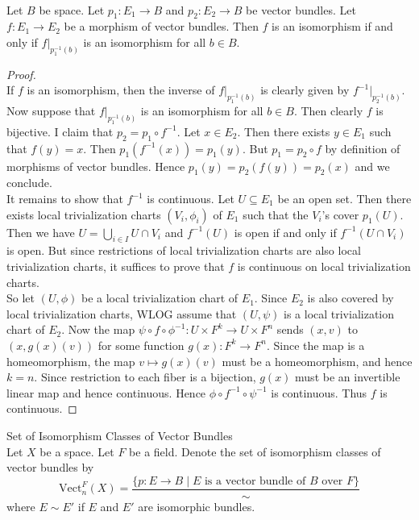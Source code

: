 \documentclass[a4paper]{article}
\begin{document}
\begin{lmm}{}{}\\
Let $B$ be space. Let $p_1:E_1\to B$ and $p_2:E_2\to B$ be vector bundles. Let $f:E_1\to E_2$ be a morphism of vector bundles. Then $f$ is an isomorphism if and only if $f|_{p_1^{-1}(b)}$ is an isomorphism for all $b\in B$. 
\begin{proof}\\
If $f$ is an isomorphism, then the inverse of $f|_{p_1^{-1}(b)}$ is clearly given by $f^{-1}|_{p_2^{-1}(b)}$. \\

Now suppose that $f|_{p_1^{-1}(b)}$ is an isomorphism for all $b\in B$. Then clearly $f$ is bijective. I claim that $p_2=p_1\circ f^{-1}$. Let $x\in E_2$. Then there exists $y\in E_1$ such that $f(y)=x$. Then $p_1(f^{-1}(x))=p_1(y)$. But $p_1=p_2\circ f$ by definition of morphisms of vector bundles. Hence $p_1(y)=p_2(f(y))=p_2(x)$ and we conclude. \\

It remains to show that $f^{-1}$ is continuous. Let $U\subseteq E_1$ be an open set. Then there exists local trivialization charts $(V_i,\phi_i)$ of $E_1$ such that the $V_i$'s cover $p_1(U)$. Then we have $U=\bigcup_{i\in I}U\cap V_i$ and $f^{-1}(U)$ is open if and only if $f^{-1}(U\cap V_i)$ is open. But since restrictions of local trivialization charts are also local trivialization charts, it suffices to prove that $f$ is continuous on local trivialization charts. \\

So let $(U,\phi)$ be a local trivialization chart of $E_1$. Since $E_2$ is also covered by local trivialization charts, WLOG assume that $(U,\psi)$ is a local trivialization chart of $E_2$. Now the map $\psi\circ f\circ\phi^{-1}:U\times F^k\to U\times F^n$ sends $(x,v)$ to $(x,g(x)(v))$ for some function $g(x):F^k\to F^n$. Since the map is a homeomorphism, the map $v\mapsto g(x)(v)$ must be a homeomorphism, and hence $k=n$. Since restriction to each fiber is a bijection, $g(x)$ must be an invertible linear map and hence continuous. Hence $\phi\circ f^{-1}\circ\psi^{-1}$ is continuous. Thus $f$ is continuous. 
\end{proof}
\end{lmm}

\begin{defn}{Set of Isomorphism Classes of Vector Bundles}{}\\
Let $X$ be a space. Let $F$ be a field. Denote the set of isomorphism classes of vector bundles by $$\text{Vect}_n^F(X)=\frac{\{p:E\to B\;|\;E\text{ is a vector bundle of }B\text{ over }F\}}{\sim}$$ where $E\sim E'$ if $E$ and $E'$ are isomorphic bundles. 
\end{defn}
\end{document}
